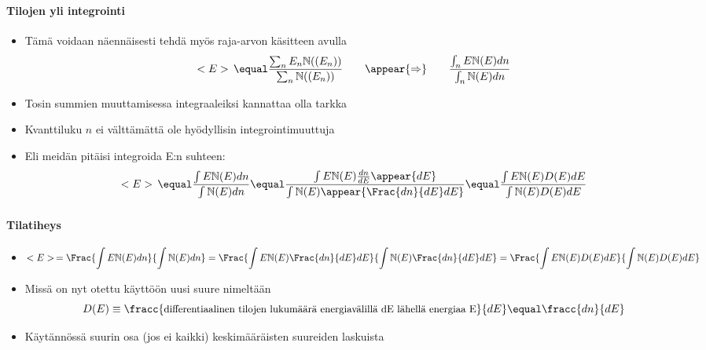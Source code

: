 \begin{frame}
\frametitle{\texorpdfstring{\culine[\sectiontitleulinecolor]{\sectiontitle}}{\sectiontitle} }
\framesubtitle{Tilojen yli integrointi}
\appear{}
\begin{itemize}
	\item Tämä voidaan näennäisesti tehdä myös raja-arvon käsitteen avulla
\[ 
  < E >\,  \equal \frac{\sum_{n} E_{n} \mathbb{N} \textrm{((} E_{n} \textrm{))} }{\sum_{n} \mathbb{N} \textrm{((} E_{n} \textrm{))} } \qquad \appear{\Rightarrow} \qquad \frac{\int_{n} E \mathbb{N}(E) d n}{\int_{n} \mathbb{N}(E) d n} 
 \]
	\item Tosin summien muuttamisessa integraaleiksi kannattaa olla tarkka
	
\item Kvanttiluku $n$ ei välttämättä ole hyödyllisin integrointimuuttuja

\item Eli meidän pitäisi integroida E:n suhteen:
\[ 
  < E >\,  \equal \frac{\int E \mathbb{N}(E) d n}{\int \mathbb{N}(E) d n} \equal \frac{\int E \mathbb{N}(E) \frac{d n}{d E} \appear{d E}}{\int \mathbb{N}(E) \appear{\Frac{d n}{d E} d E}} \equal \frac{\int E \mathbb{N}(E) D(E) d E}{\int \mathbb{N}(E) D(E) d E} 
 \]

\end{itemize}

\endofslide 
\end{frame}

\begin{frame}
\frametitle{\texorpdfstring{\culine[\sectiontitleulinecolor]{\sectiontitle}}{\sectiontitle} }
\framesubtitle{Tilatiheys}

\begin{itemize}
\item[] %
\[ 
  < E >\,  = \Frac{\int E \mathbb{N}(E) d n}{\int \mathbb{N}(E) d n}  = \Frac{\int E \mathbb{N}(E) \Frac{d n}{d E} d E}{\int \mathbb{N}(E) \Frac{d n}{d E} d E} = \Frac{\int E \mathbb{N}(E) D(E) d E}{\int \mathbb{N}(E) D(E) d E} 
 \]
\item Missä on nyt otettu käyttöön uusi suure nimeltään  
\[ 
 D(E) \equiv \fracc{\text{\small differentiaalinen tilojen lukumäärä energiavälillä dE lähellä energiaa E}}{d E} \equal \fracc{d n}{d E} 
 \]

\item Käytännössä suurin osa (jos ei kaikki) keskimääräisten suureiden laskuista 
\end{itemize}

\endofslide 
\end{frame}


